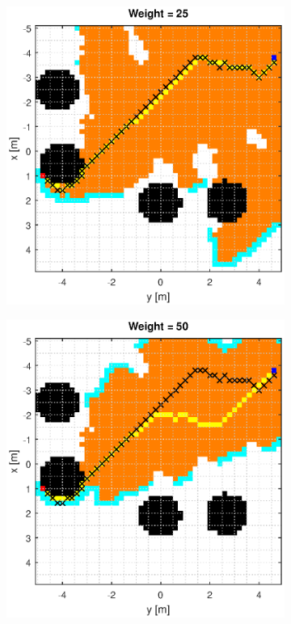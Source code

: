 \documentclass[Space3_Assign3.tex]{subfile}
\begin{document}
\begin{figure}
\begin{subfigure}{0.49\linewidth}
\end{subfigure}
\begin{subfigure}{0.49\linewidth}
\includegraphics[width = 1\linewidth]{Astar_euc_25.eps}
\end{subfigure}
\begin{subfigure}{0.49\linewidth}
\includegraphics[width = 1\linewidth]{Astar_euc_50.eps}

\end{subfigure}
\end{figure}
\end{document}
